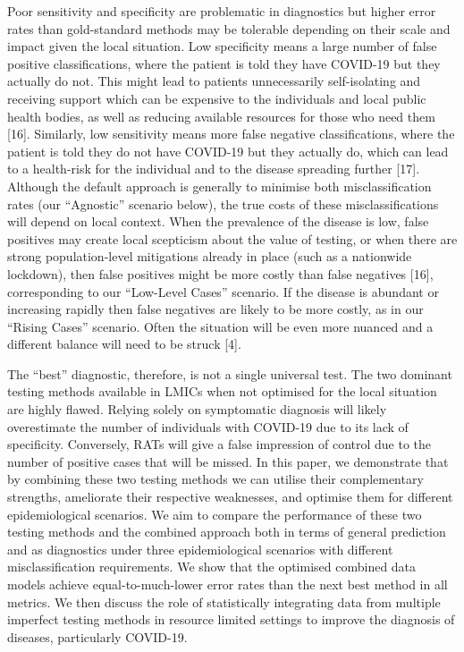\documentclass[]{elsarticle} %
\begin{document}
Poor sensitivity and specificity are problematic in diagnostics but higher error rates than gold-standard methods may be tolerable depending on their scale and impact given the local situation.
Low specificity means a large number of false positive classifications, where the patient is told they have COVID-19 but they actually do not.
This might lead to patients unnecessarily self-isolating and receiving support which can be expensive to the individuals and local public health bodies, as well as reducing available resources for those who need them {[}16{]}.
Similarly, low sensitivity means more false negative classifications, where the patient is told they do not have COVID-19 but they actually do, which can lead to a health-risk for the individual and to the disease spreading further {[}17{]}.
Although the default approach is generally to minimise both misclassification rates (our ``Agnostic'' scenario below), the true costs of these misclassifications will depend on local context.
When the prevalence of the disease is low, false positives may create local scepticism about the value of testing, or when there are strong population-level mitigations already in place (such as a nationwide lockdown), then false positives might be more costly than false negatives {[}16{]}, corresponding to our ``Low-Level Cases'' scenario.
If the disease is abundant or increasing rapidly then false negatives are likely to be more costly, as in our ``Rising Cases'' scenario.
Often the situation will be even more nuanced and a different balance will need to be struck {[}4{]}.

The ``best'' diagnostic, therefore, is not a single universal test.
The two dominant testing methods available in LMICs when not optimised for the local situation are highly flawed.
Relying solely on symptomatic diagnosis will likely overestimate the number of individuals with COVID-19 due to its lack of specificity.
Conversely, RATs will give a false impression of control due to the number of positive cases that will be missed.
In this paper, we demonstrate that by combining these two testing methods we can utilise their complementary strengths, ameliorate their respective weaknesses, and optimise them for different epidemiological scenarios.
We aim to compare the performance of these two testing methods and the combined approach both in terms of general prediction and as diagnostics under three epidemiological scenarios with different misclassification requirements.
We show that the optimised combined data models achieve equal-to-much-lower error rates than the next best method in all metrics.
We then discuss the role of statistically integrating data from multiple imperfect testing methods in resource limited settings to improve the diagnosis of diseases, particularly COVID-19.
\end{document}

